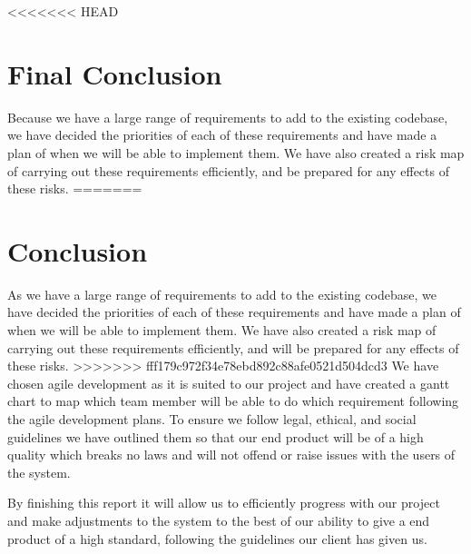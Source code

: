 <<<<<<< HEAD
\section{Final Conclusion}
Because we have a large range of requirements to add to the existing codebase, we have decided the priorities of each of these requirements and have made a plan of when we will be able to implement them. We have also created a risk map of carrying out these requirements efficiently, and be prepared for any effects of these risks. 
=======
\section{Conclusion}
As we have a large range of requirements to add to the existing codebase, we have decided the priorities of each of these requirements and have made a plan of when we will be able to implement them. We have also created a risk map of carrying out these requirements efficiently, and will be prepared for any effects of these risks. 
>>>>>>> fff179c972f34e78ebd892c88afe0521d504dcd3
We have chosen agile development as it is suited to our project and have created a gantt chart to map which team member will be able to do which requirement following the agile development plans. 
To ensure we follow legal, ethical, and social guidelines we have outlined them so that our end product will be of a high quality which breaks no laws and will not offend or raise issues with the users of the system.

By finishing this report it will allow us to efficiently progress with our project and make adjustments to the system to the best of our ability to give a end product of a high standard, following the guidelines our client has given us.

  
